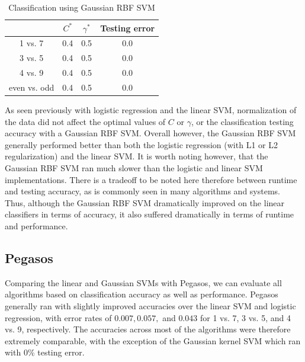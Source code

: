 \documentclass{article}
\begin{document}
\begin{table}
  \begin{center}
    \begin{tabular}{ | c | c | c | c | }
      \hline
                     & $C^*$          & $\gamma^*$           & Testing error      \\ \hline
      1 vs. 7        & 0.4            & 0.5                  & 0.0                \\ \hline
      3 vs. 5        & 0.4            & 0.5                  & 0.0                \\ \hline
      4 vs. 9        & 0.4            & 0.5                  & 0.0                \\ \hline
      even vs. odd   & 0.4            & 0.5                  & 0.0                \\ \hline
    \end{tabular}
  \end{center}
  \caption{Classification using Gaussian RBF SVM}
\end{table}

As seen previously with logistic regression and the linear SVM, normalization of the data did not affect the optimal values of $C$ or $\gamma$, or the classification testing accuracy with a Gaussian RBF SVM. Overall however, the Gaussian RBF SVM generally performed better than both the logistic regression (with L1 or L2 regularization) and the linear SVM. It is worth noting however, that the Gaussian RBF SVM ran much slower than the logistic and linear SVM implementations. There is a tradeoff to be noted here therefore between runtime and testing accuracy, as is commonly seen in many algorithms and systems. Thus, although the Gaussian RBF SVM dramatically improved on the linear classifiers in terms of accuracy, it also suffered dramatically in terms of runtime and performance.

\subsection{Pegasos}

Comparing the linear and Gaussian SVMs with Pegasos, we can evaluate all algorithms based on classification accuracy as well as performance. Pegasos generally ran with slightly improved accuracies over the linear SVM and logistic regression, with error rates of $0.007, 0.057,$ and $0.043$ for 1 vs. 7, 3 vs. 5, and 4 vs. 9, respectively. The accuracies across most of the algorithms were therefore extremely comparable, with the exception of the Gaussian kernel SVM which ran with 0\% testing error. \\
\end{document}
